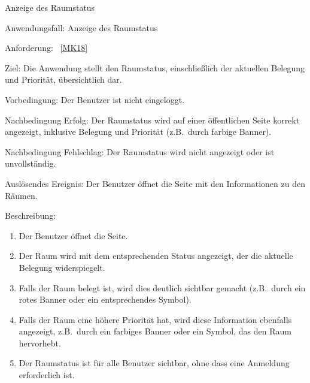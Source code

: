 \begin{function}{70}{Anzeige des Raumstatus}
    \item[Anwendungsfall:] Anzeige des Raumstatus
    \item[Anforderung:] ~\ref{MK18}
    \item[Ziel:] Die Anwendung stellt den Raumstatus, einschließlich der aktuellen Belegung und Priorität, übersichtlich dar.
    \item[Vorbedingung:] Der Benutzer ist nicht eingeloggt. 
    \item[Nachbedingung Erfolg:] Der Raumstatus wird auf einer öffentlichen Seite korrekt angezeigt, inklusive Belegung und Priorität (z.B.\ durch farbige Banner).
    \item[Nachbedingung Fehlschlag:] Der Raumstatus wird nicht angezeigt oder ist unvollständig.
    \item[Auslösendes Ereignis:] Der Benutzer öffnet die Seite mit den Informationen zu den Räumen.
    \item[Beschreibung:] ~
    \begin{enumerate}
        \item Der Benutzer öffnet die Seite.
        \item Der Raum wird mit dem entsprechenden Status angezeigt, der die aktuelle Belegung widerspiegelt.
        \item Falls der Raum belegt ist, wird dies deutlich sichtbar gemacht (z.B.\ durch ein rotes Banner oder ein entsprechendes Symbol).
        \item Falls der Raum eine höhere Priorität hat, wird diese Information ebenfalls angezeigt, z.B.\ durch ein farbiges Banner oder ein Symbol, das den Raum hervorhebt.
        \item Der Raumstatus ist für alle Benutzer sichtbar, ohne dass eine Anmeldung erforderlich ist.
    \end{enumerate}
\end{function}

\pagebreak

